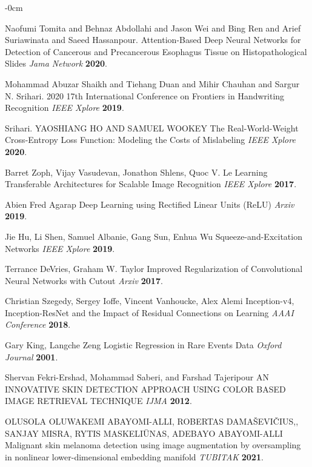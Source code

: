 \documentclass[sensors,article,submit,pdftex,moreauthors]{Definitions/mdpi}
\begin{document}
\begin{adjustwidth}{-\extralength}{0cm}
\begin{thebibliography}{999}
			Naofumi Tomita and Behnaz Abdollahi and Jason Wei and Bing Ren and Arief Suriawinata and Saeed Hassanpour. Attention-Based Deep Neural Networks for Detection of Cancerous and Precancerous Esophagus Tissue on Histopathological Slides
			{\em Jama Network} 
			{\bf 2020}.
			
			Mohammad Abuzar Shaikh and Tiehang Duan and Mihir Chauhan and Sargur N. Srihari. 2020 17th International Conference on Frontiers in Handwriting Recognition
			{\em IEEE Xplore} 
			{\bf 2019}.
			
			Srihari. YAOSHIANG HO AND SAMUEL WOOKEY The Real-World-Weight Cross-Entropy Loss Function: Modeling the Costs of Mislabeling 
			{\em IEEE Xplore} 
			{\bf 2020}.
			
			Barret Zoph, Vijay Vasudevan, Jonathon Shlens, Quoc V. Le Learning Transferable Architectures for Scalable Image Recognition 
			{\em IEEE Xplore} 
			{\bf 2017}.
			
			Abien Fred Agarap Deep Learning using Rectified Linear Units (ReLU) 
			{\em Arxiv} 
			{\bf 2019}.
			
			Jie Hu, Li Shen, Samuel Albanie, Gang Sun, Enhua Wu Squeeze-and-Excitation Networks 
			{\em IEEE Xplore} 
			{\bf 2019}.
			
			Terrance DeVries, Graham W. Taylor Improved Regularization of Convolutional Neural Networks with Cutout 
			{\em Arxiv} 
			{\bf 2017}.
			
			Christian Szegedy, Sergey Ioffe, Vincent Vanhoucke, Alex Alemi Inception-v4, Inception-ResNet and the Impact of Residual Connections on Learning
			{\em AAAI Conference} 
			{\bf 2018}.
			
			Gary King, Langche Zeng Logistic Regression in Rare Events Data
			{\em Oxford Journal} 
			{\bf 2001}.
			
			Shervan Fekri-Ershad, Mohammad Saberi, and Farshad Tajeripour AN INNOVATIVE SKIN DETECTION APPROACH
			USING COLOR BASED IMAGE RETRIEVAL TECHNIQUE
			{\em IJMA} 
			{\bf 2012}.
			
			OLUSOLA OLUWAKEMI ABAYOMI-ALLI, ROBERTAS DAMAŠEVIČIUS,,
			SANJAY MISRA, RYTIS MASKELIŪNAS, ADEBAYO ABAYOMI-ALLI Malignant skin melanoma detection using image augmentation by oversampling in nonlinear lower-dimensional embedding manifold
			{\em TUBITAK} 
			{\bf 2021}.
			

\end{thebibliography}
\end{adjustwidth}
\end{document}
